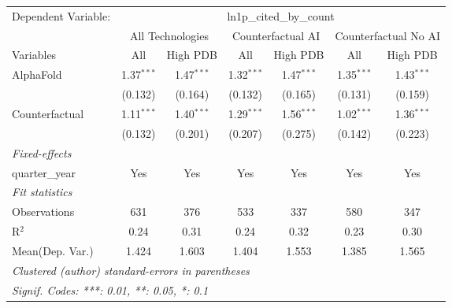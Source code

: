 \begingroup
\centering
\begin{tabular}{lcccccc}
   \tabularnewline \midrule \midrule
   Dependent Variable: & \multicolumn{6}{c}{ln1p\_cited\_by\_count}\\
 & \multicolumn{2}{c}{All Technologies} & \multicolumn{2}{c}{Counterfactual AI} & \multicolumn{2}{c}{Counterfactual No AI} \\
\cmidrule(lr){1-1}\cmidrule(lr){2-3} \cmidrule(lr){4-5} \cmidrule(lr){6-7}
Variables & \multicolumn{1}{c}{All} & \multicolumn{1}{c}{High PDB} & \multicolumn{1}{c}{All} & \multicolumn{1}{c}{High PDB} & \multicolumn{1}{c}{All} & \multicolumn{1}{c}{High PDB} \\
\cmidrule(lr){1-1}\cmidrule(lr){2-2} \cmidrule(lr){3-3} \cmidrule(lr){4-4} \cmidrule(lr){5-5} \cmidrule(lr){6-6} \cmidrule(lr){7-7}
   AlphaFold      & 1.37$^{***}$ & 1.47$^{***}$ & 1.32$^{***}$ & 1.47$^{***}$ & 1.35$^{***}$ & 1.43$^{***}$\\   
                  & (0.132)      & (0.164)      & (0.132)      & (0.165)      & (0.131)      & (0.159)\\   
   Counterfactual & 1.11$^{***}$ & 1.40$^{***}$ & 1.29$^{***}$ & 1.56$^{***}$ & 1.02$^{***}$ & 1.36$^{***}$\\   
                  & (0.132)      & (0.201)      & (0.207)      & (0.275)      & (0.142)      & (0.223)\\   
   \midrule
   \emph{Fixed-effects}\\
   quarter\_year  & Yes          & Yes          & Yes          & Yes          & Yes          & Yes\\  
   \midrule
   \emph{Fit statistics}\\
   Observations   & 631          & 376          & 533          & 337          & 580          & 347\\  
   R$^2$          & 0.24         & 0.31         & 0.24         & 0.32         & 0.23         & 0.30\\  
Mean(Dep. Var.) & 1.424 & 1.603 & 1.404 & 1.553 & 1.385 & 1.565 \\
   \midrule \midrule
   \multicolumn{7}{l}{\emph{Clustered (author) standard-errors in parentheses}}\\
   \multicolumn{7}{l}{\emph{Signif. Codes: ***: 0.01, **: 0.05, *: 0.1}}\\
\end{tabular}
\par\endgroup
